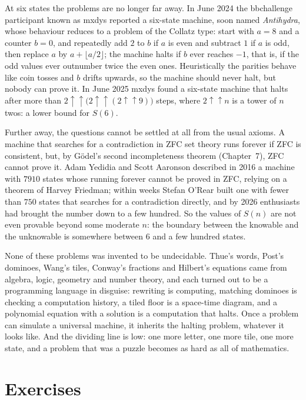 At six states the problems are no longer far away. In June 2024 the bbchallenge participant known as mxdys reported a six-state machine, soon named \emph{Antihydra}, whose behaviour reduces to a problem of the Collatz type: start with $a=8$ and a counter $b=0$, and repeatedly add $2$ to $b$ if $a$ is even and subtract $1$ if $a$ is odd, then replace $a$ by $a+\lfloor a/2\rfloor$; the machine halts if $b$ ever reaches $-1$, that is, if the odd values ever outnumber twice the even ones. Heuristically the parities behave like coin tosses and $b$ drifts upwards, so the machine should never halt, but nobody can prove it. In June 2025 mxdys found a six-state machine that halts after more than $2\uparrow\uparrow\bigl(2\uparrow\uparrow(2\uparrow\uparrow9)\bigr)$ steps, where $2\uparrow\uparrow n$ is a tower of $n$ twos: a lower bound for $S(6)$.

Further away, the questions cannot be settled at all from the usual axioms. A machine that searches for a contradiction in ZFC set theory runs forever if ZFC is consistent, but, by Gödel's second incompleteness theorem (Chapter~7), ZFC cannot prove it. Adam Yedidia and Scott Aaronson described in 2016 a machine with $7910$ states whose running forever cannot be proved in ZFC, relying on a theorem of Harvey Friedman; within weeks Stefan O'Rear built one with fewer than $750$ states that searches for a contradiction directly, and by 2026 enthusiasts had brought the number down to a few hundred. So the values of $S(n)$ are not even provable beyond some moderate $n$: the boundary between the knowable and the unknowable is somewhere between $6$ and a few hundred states.

\begin{beauty}
None of these problems was invented to be undecidable. Thue's words, Post's dominoes, Wang's tiles, Conway's fractions and Hilbert's equations came from algebra, logic, geometry and number theory, and each turned out to be a programming language in disguise: rewriting is computing, matching dominoes is checking a computation history, a tiled floor is a space-time diagram, and a polynomial equation with a solution is a computation that halts. Once a problem can simulate a universal machine, it inherits the halting problem, whatever it looks like. And the dividing line is low: one more letter, one more tile, one more state, and a problem that was a puzzle becomes as hard as all of mathematics.
\end{beauty}

\section{Exercises}

